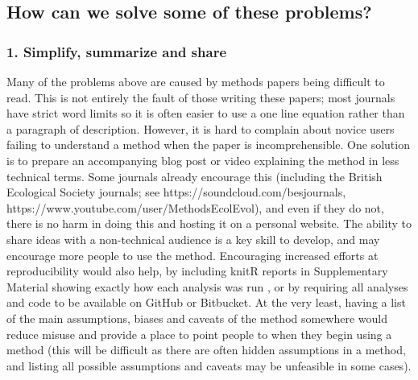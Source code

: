\documentclass[a4paper,12pt]{article}
\begin{document}

\subsection{How can we solve some of these problems?}
  \subsubsection{1. Simplify, summarize and share}
    Many of the problems above are caused by methods papers being difficult to read. 
    This is not entirely the fault of those writing these papers; most journals have strict word limits so it is often easier to use a one line equation rather than a paragraph of description. 
    However, it is hard to complain about novice users failing to understand a method when the paper is incomprehensible.
    One solution is to prepare an accompanying blog post or video explaining the method in less technical terms. 
    Some journals already encourage this (including the British Ecological Society journals; see https://soundcloud.com/besjournals, https://www.youtube.com/user/MethodsEcolEvol), and even if they do not, there is no harm in doing this and hosting it on a personal website. 
    The ability to share ideas with a non-technical audience is a key skill to develop, and may encourage more people to use the method.
    Encouraging increased efforts at reproducibility would also help, by including knitR \citep{Xie:2015aa} reports in Supplementary Material showing exactly how each analysis was run \citep[e.g.][]{fitzjohn2014much}, or by requiring all analyses and code to be available on GitHub or Bitbucket. 
    At the very least, having a list of the main assumptions, biases and caveats of the method somewhere would reduce misuse and provide a place to point people to when they begin using a method (this will be difficult as there are often hidden assumptions in a method, and listing all possible assumptions and caveats may be unfeasible in some cases).\\
\end{document}
